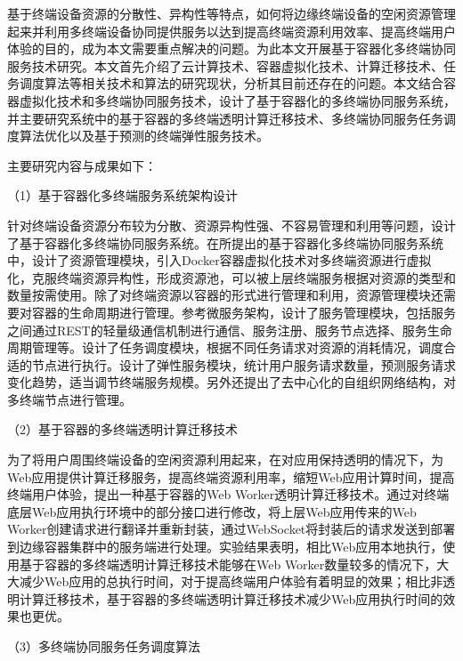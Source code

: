 基于终端设备资源的分散性、异构性等特点，如何将边缘终端设备的空闲资源管理起来并利用多终端设备协同提供服务以达到提高终端资源利用效率、提高终端用户体验的目的，成为本文需要重点解决的问题。为此本文开展基于容器化多终端协同服务技术研究。本文首先介绍了云计算技术、容器虚拟化技术、计算迁移技术、任务调度算法等相关技术和算法的研究现状，分析其目前还存在的问题。本文结合容器虚拟化技术和多终端协同服务技术，设计了基于容器化的多终端协同服务系统，并主要研究系统中的基于容器的多终端透明计算迁移技术、多终端协同服务任务调度算法优化以及基于预测的终端弹性服务技术。

主要研究内容与成果如下： 

（1）基于容器化多终端服务系统架构设计

针对终端设备资源分布较为分散、资源异构性强、不容易管理和利用等问题，设计了基于容器化多终端协同服务系统。在所提出的基于容器化多终端协同服务系统中，设计了资源管理模块，引入Docker容器虚拟化技术对多终端资源进行虚拟化，克服终端资源异构性，形成资源池，可以被上层终端服务根据对资源的类型和数量按需使用。除了对终端资源以容器的形式进行管理和利用，资源管理模块还需要对容器的生命周期进行管理。参考微服务架构，设计了服务管理模块，包括服务之间通过REST的轻量级通信机制进行通信、服务注册、服务节点选择、服务生命周期管理等。设计了任务调度模块，根据不同任务请求对资源的消耗情况，调度合适的节点进行执行。设计了弹性服务模块，统计用户服务请求数量，预测服务请求变化趋势，适当调节终端服务规模。另外还提出了去中心化的自组织网络结构，对多终端节点进行管理。

（2）基于容器的多终端透明计算迁移技术

为了将用户周围终端设备的空闲资源利用起来，在对应用保持透明的情况下，为Web应用提供计算迁移服务，提高终端资源利用率，缩短Web应用计算时间，提高终端用户体验，提出一种基于容器的Web Worker透明计算迁移技术。通过对终端底层Web应用执行环境中的部分接口进行修改，将上层Web应用传来的Web Worker创建请求进行翻译并重新封装，通过WebSocket将封装后的请求发送到部署到边缘容器集群中的服务端进行处理。实验结果表明，相比Web应用本地执行，使用基于容器的多终端透明计算迁移技术能够在Web Worker数量较多的情况下，大大减少Web应用的总执行时间，对于提高终端用户体验有着明显的效果；相比非透明计算迁移技术，基于容器的多终端透明计算迁移技术减少Web应用执行时间的效果也更优。

（3）多终端协同服务任务调度算法 

